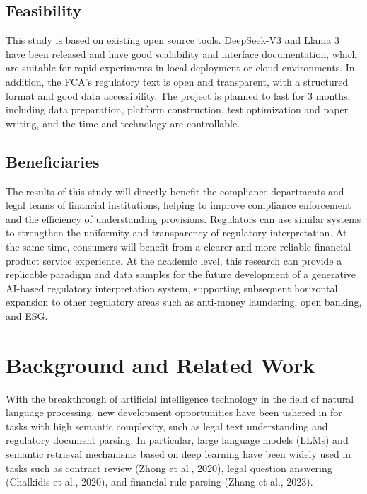 \documentclass[a4paper,11pt]{article}
\begin{document}
\subsection{Feasibility}

This study is based on existing open source tools. DeepSeek-V3 and Llama 3 have been released and have good scalability and interface documentation, which are suitable for rapid experiments in local deployment or cloud environments. In addition, the FCA's regulatory text is open and transparent, with a structured format and good data accessibility. The project is planned to last for 3 months, including data preparation, platform construction, test optimization and paper writing, and the time and technology are controllable.

\subsection{Beneficiaries}

The results of this study will directly benefit the compliance departments and legal teams of financial institutions, helping to improve compliance enforcement and the efficiency of understanding provisions. Regulators can use similar systems to strengthen the uniformity and transparency of regulatory interpretation. At the same time, consumers will benefit from a clearer and more reliable financial product service experience. At the academic level, this research can provide a replicable paradigm and data samples for the future development of a generative AI-based regulatory interpretation system, supporting subsequent horizontal expansion to other regulatory areas such as anti-money laundering, open banking, and ESG.

\section{Background and Related Work}

With the breakthrough of artificial intelligence technology in the field of natural language processing, new development opportunities have been ushered in for tasks with high semantic complexity, such as legal text understanding and regulatory document parsing. In particular, large language models (LLMs) and semantic retrieval mechanisms based on deep learning have been widely used in tasks such as contract review (Zhong et al., 2020), legal question answering (Chalkidis et al., 2020), and financial rule parsing (Zhang et al., 2023).
\end{document}
